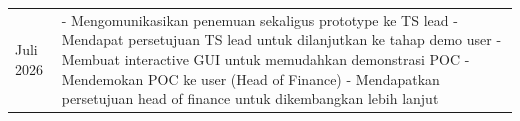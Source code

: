\begin{longtable}{>{\raggedright\arraybackslash}p{2.7cm} >{\raggedright\arraybackslash}p{\dimexpr\textwidth-2.7cm-4\tabcolsep\relax}}
    14 Juli 2026 & - Mengomunikasikan penemuan sekaligus prototype ke TS lead \newline - Mendapat persetujuan TS lead untuk dilanjutkan ke tahap demo user \newline - Membuat interactive GUI untuk memudahkan demonstrasi POC \newline - Mendemokan POC ke user (Head of Finance) \newline - Mendapatkan persetujuan head of finance untuk dikembangkan lebih lanjut \\
\end{longtable}
\endgroup

